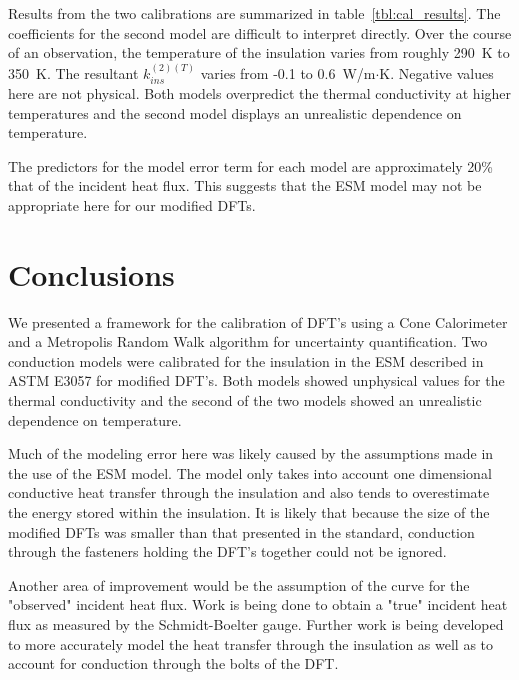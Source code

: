 \documentclass[article]{proc}
\begin{document}
        Results from the two calibrations are summarized in table~\ref{tbl:cal_results}. The coefficients for the second model are difficult to interpret directly. Over the course of an observation, the temperature of the insulation varies from roughly 290~K to 350~K. The resultant $k_{ins}^{(2)(T)}$ varies from -0.1 to 0.6~W/m$\cdot$K. Negative values here are not physical. Both models overpredict the thermal conductivity at higher temperatures and the second model displays an unrealistic dependence on temperature. 

        The predictors for the model error term for each model are approximately 20\% that of the incident heat flux. This suggests that the ESM model may not be appropriate here for our modified DFTs.

\section{Conclusions}

    We presented a framework for the calibration of DFT's using a Cone Calorimeter and a Metropolis Random Walk algorithm for uncertainty quantification. Two conduction models were calibrated for the insulation in the ESM described in ASTM E3057 for modified DFT's. Both models showed unphysical values for the thermal conductivity and the second of the two models showed an unrealistic dependence on temperature. 

    Much of the modeling error here was likely caused by the assumptions made in the use of the ESM model. The model only takes into account one dimensional conductive heat transfer through the insulation and also tends to overestimate the energy stored within the insulation. It is likely that because the size of the modified DFTs was smaller than that presented in the standard, conduction through the fasteners holding the DFT's together could not be ignored. 

    Another area of improvement would be the assumption of the curve for the "observed" incident heat flux. Work is being done to obtain a "true" incident heat flux as measured by the Schmidt-Boelter gauge. Further work is being developed to more accurately model the heat transfer through the insulation as well as to account for conduction through the bolts of the DFT.
    
\clearpage

\scriptsize{

}
\end{document}
